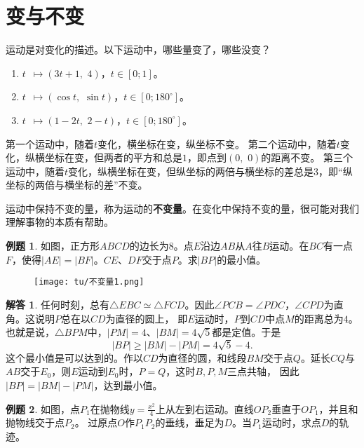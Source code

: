 \documentclass[12pt,UTF8]{ctexbook}
\theoremstyle{definition}
\newtheorem{et}{例题}[section]
\newtheorem*{so}{解答}
\theoremstyle{plain}
\begin{document}
\section{变与不变}
运动是对变化的描述。以下运动中，哪些量变了，哪些没变？
\begin{enumerate}
    \item $ t \,\,\,\mapsto (3t+1, \,\, 4)$，$t\in[0;1]$。
    \item $ t \,\,\,\mapsto (\cos{t}, \,\, \sin{t})$，$t\in[0;180^\circ]$。
    \item $ t \,\,\,\mapsto (1 - 2t, \,\, 2 - t)$，$t\in[0;180^\circ]$。
\end{enumerate}
第一个运动中，随着$t$变化，横坐标在变，纵坐标不变。
第二个运动中，随着$t$变化，纵横坐标在变，但两者的平方和总是$1$，即点到$(0,\,\,0)$的距离不变。
第三个运动中，随着$t$变化，纵横坐标在变，但纵坐标的两倍与横坐标的差总是$3$，即“纵坐标的两倍与横坐标的差”不变。

运动中保持不变的量，称为运动的\textbf{不变量}。在变化中保持不变的量，很可能对我们理解事物的本质有帮助。

\begin{et}
    如图，正方形$ABCD$的边长为$8$。点$E$沿边$AB$从$A$往$B$运动。在$BC$有一点$F$，使得$|AE| = |BF|$。$CE$、$DF$交于点$P$。求$|BP|$的最小值。
\end{et}

\begin{figure}[H] %
    \vspace{4pt}
    \centering
    \texttt{[image: tu/不变量1.png]}
\end{figure}

\begin{so}
    任何时刻，总有$\triangle EBC \simeq \triangle FCD$。因此$\angle PCB = \angle PDC$，$\angle CPD$为直角。这说明$P$总在以$CD$为直径的圆上，
    即$E$运动时，$P$到$CD$中点$M$的距离总为$4$。也就是说，$\triangle BPM$中，$|PM| = 4$、$|BM| = 4\sqrt{5}$都是定值。于是
    $$ |BP| \geqslant |BM| - |PM| = 4\sqrt{5} - 4.$$
    这个最小值是可以达到的。作以$CD$为直径的圆，和线段$BM$交于点$Q$。延长$CQ$与$AB$交于$E_0$，则$E$运动到$E_0$时，$P=Q$，这时$B,P,M$三点共轴，
    因此$|BP| = |BM| - |PM|$，达到最小值。
\end{so}

\begin{et}
    如图，点$P_1$在抛物线$y = \frac{x^2}{4}$上从左到右运动。直线$OP_2$垂直于$OP_1$，并且和抛物线交于点$P_2$。
    过原点$O$作$P_1P_2$的垂线，垂足为$D$。当$P_1$运动时，求点$D$的轨迹。
\end{et}
\end{document}
